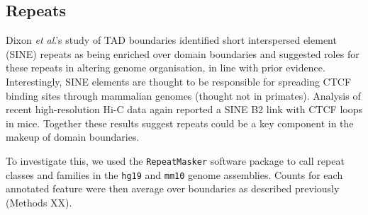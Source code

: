 \documentclass[a4paper,10pt,oneside]{book}
\begin{document}

\subsection{Repeats}\label{sec:repeats}

Dixon \emph{et al}.'s study of TAD boundaries identified short interspersed element (SINE) repeats as being enriched over domain boundaries and suggested roles for these repeats in altering genome organisation, in line with prior evidence.\cite{Dixon2012, Lunyak2007} Interestingly, SINE elements are thought to be responsible for spreading CTCF binding sites through mammalian genomes\cite{Schmidt2012} (thought not in primates\cite{Schwalie2013}). Analysis of recent high-resolution Hi-C data again reported a SINE B2 link with CTCF loops in mice.\cite{Rao2014} Together these results suggest repeats could be a key component in the makeup of domain boundaries.

To investigate this, we used the \texttt{RepeatMasker}\cite{Tarailo-Graovac2009} software package to call repeat classes and families in the \texttt{hg19} and \texttt{mm10} genome assemblies. Counts for each annotated feature were then average over boundaries as described previously (Methods XX).
\end{document}
